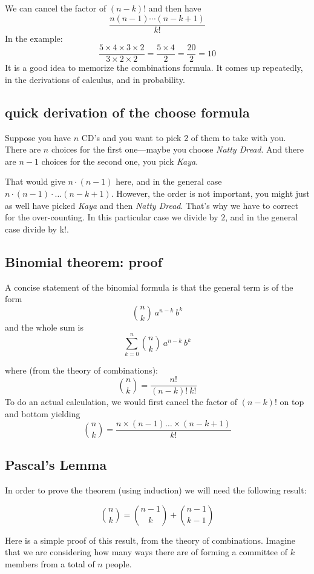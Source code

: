 \documentclass[11pt, oneside]{article}   	%
\begin{document}
We can cancel the factor of $(n-k)!$ and then have
\[ \frac{n(n-1) \cdots (n-k+1)}{k!} \]
In the example:
\[ \frac{5 \times 4 \times 3 \times 2 }{3 \times 2 \times 2} = \frac{5 \times 4 }{2} = \frac{20}{2} = 10 \]
It is a good idea to memorize the combinations formula.  It comes up repeatedly, in the derivations of calculus, and in probability.  

\subsection*{quick derivation of the choose formula}
Suppose you have $n$ CD's and you want to pick 2 of them to take with you.  There are $n$ choices for the first one---maybe you choose \emph{Natty Dread}.  And there are $n-1$ choices for the second one, you pick \emph{Kaya}.

That would give $n \cdot (n-1)$ here, and in the general case $n \cdot (n-1) \cdot \dots (n-k+1)$.  However, the order is not important, you might just as well have picked \emph{Kaya} and then \emph{Natty Dread}.  That's why we have to correct for the over-counting.  In this particular case we divide by $2$, and in the general case divide by k!.

\subsection*{Binomial theorem:  proof}
A concise statement of the binomial formula is that the general term is of the form
\[ {{n}\choose{k}} \ a^{n-k} \ b^k  \]
and the whole sum is
\[ \sum_{k=0}^{n} {{n}\choose{k}} \ a^{n-k} \ b^k  \]

where (from the theory of combinations):
\[  {{n}\choose{k}} = \frac{n!}{(n-k)! \ k!} \]
To do an actual calculation, we would first cancel the factor of $(n-k)!$ on top and bottom yielding
\[  {{n}\choose{k}} = \frac{n \times (n-1) \dots \times (n-k+1)}{k!} \]

\subsection*{Pascal's Lemma}
In order to prove the theorem (using induction) we will need the following result:

\[  {{n}\choose{k}} = {{n-1}\choose{k}} + {{n-1}\choose{k-1}} \]

Here is a simple proof of this result, from the theory of combinations.  Imagine that we are considering how many ways there are of forming a committee of $k$ members from a total of $n$ people.
\end{document}
